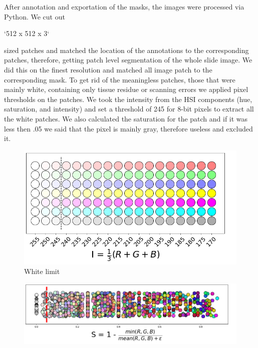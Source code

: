 \documentclass[a4paper,12pt]{article}
\begin{document}
\par After annotation and exportation of the masks, the images were processed via Python. We cut out \begin{markdown} 
`512 x 512 x 3`  
\end{markdown} 
sized patches and matched the location of the annotations to the corresponding patches, therefore, getting patch level segmentation of the whole slide image. We did this on the finest resolution and matched all image patch to the corresponding mask. To get rid of the meaningless patches, those that were mainly white, containing only tissue residue or scanning errors we applied pixel thresholds on the patches. We took the intensity from the HSI components (hue, saturation, and intensity) and set a threshold of 245 for 8-bit pixels to extract all the white patches. We also calculated the saturation for the patch and if it was less then .05 we said that the pixel is mainly gray, therefore useless and excluded it.

\vspace{4mm}

\begin{figure}[H]
    \centering
    \includegraphics[width=.6\textwidth]{intensity.png}
    \caption{White limit}
    \label{fig:intensity}
\end{figure}

\begin{figure}[H]
    \centering
    \includegraphics[width=.7\textwidth]{saturation.png}
    \label{fig:saturation}
\end{figure}

\vspace{4mm}
\end{document}
